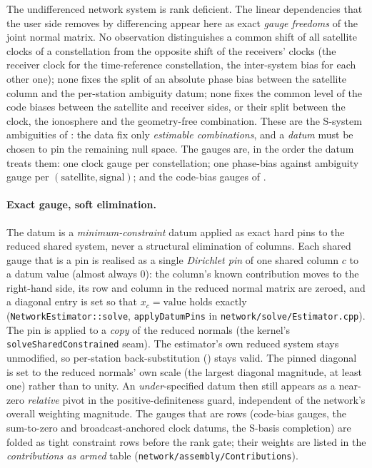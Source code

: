 \documentclass[main.tex]{subfiles}
\begin{document}
The undifferenced network system  is rank
deficient. The linear dependencies that the user side removes by
differencing appear here as exact \emph{gauge freedoms} of the joint
normal matrix. No observation distinguishes a common shift of all
satellite clocks of a constellation from the opposite shift of the
receivers' clocks (the receiver clock for the time-reference
constellation, the inter-system bias for each other one); none fixes the
split of an absolute phase bias between the satellite column and the
per-station ambiguity datum; none fixes the common level of the code
biases between the satellite and receiver sides, or their split between
the clock, the ionosphere and the geometry-free combination. These are
the S-system ambiguities of \cite{teunissen1985generalised}: the data fix
only \emph{estimable combinations}, and a \emph{datum} must be chosen to
pin the remaining null space. The gauges are, in the order the datum
treats them: one clock gauge per constellation; one phase-bias against
ambiguity gauge per $(\text{satellite},\text{signal})$; and the code-bias
gauges of .

\paragraph{Exact gauge, soft elimination.}
The datum is a \emph{minimum-constraint} datum applied as exact hard
pins to the reduced shared system, never a structural elimination of
columns. Each shared gauge that is a pin is realised as a single
\emph{Dirichlet pin} of one shared column $c$ to a datum value (almost
always $0$): the column's known contribution moves to the right-hand
side, its row and column in the reduced normal matrix are zeroed, and a
diagonal entry is set so that $x_c = \text{value}$ holds exactly
(\texttt{NetworkEstimator::solve}, \texttt{applyDatumPins} in
\texttt{network/solve/Estimator.cpp}). The pin is applied to a
\emph{copy} of the reduced normals (the kernel's
\texttt{solveSharedConstrained} seam). The estimator's own reduced
system stays unmodified, so per-station back-substitution
() stays valid. The pinned diagonal is set to the
reduced normals' own scale (the largest diagonal magnitude, at least
one) rather than to unity. An \emph{under}-specified datum then still
appears as a near-zero \emph{relative} pivot in the positive-definiteness
guard, independent of the network's overall weighting magnitude. The
gauges that are rows (code-bias gauges, the sum-to-zero and
broadcast-anchored clock datums, the S-basis completion) are folded as
tight constraint rows before the rank gate; their weights are listed in
the \emph{contributions as armed} table
(\texttt{network/assembly/Contributions}).
\end{document}
